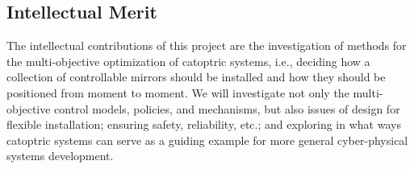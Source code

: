 \subsection{Intellectual Merit}
\label{sec:merit}

The intellectual contributions of this project are
the investigation of
methods for the multi-objective optimization of catoptric systems, i.e., deciding how a collection of
controllable mirrors should be installed and how they should be positioned from moment to moment.
We will investigate not only the multi-objective control models, policies, and mechanisms, but also
issues of design for flexible installation; ensuring safety, reliability, etc.; and exploring in what ways
catoptric systems can serve as a guiding example for more general cyber-physical systems development.
